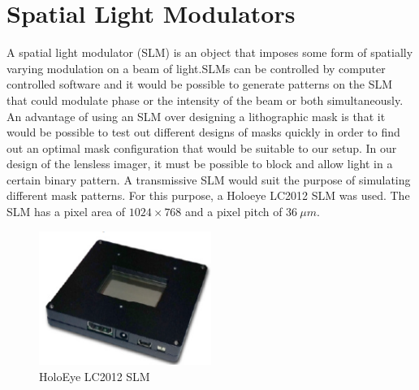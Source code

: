 \section{Spatial Light Modulators}
A spatial light modulator (SLM) is an object that imposes some form of spatially varying modulation on a beam of light\cite{SLMWiki}.SLMs can be controlled by computer controlled software and it would be possible to generate patterns on the SLM that could modulate phase or the intensity of the beam or both simultaneously. An advantage of using an SLM over designing a lithographic mask is that it would be possible to test out different designs of masks quickly in order to find out an optimal mask configuration that would be suitable to our setup. In our design of the lensless imager, it must be possible to block and allow light in a certain binary pattern. A transmissive SLM would suit the purpose of simulating different mask patterns. For this purpose, a Holoeye LC2012 SLM was used. The SLM has a pixel area of $1024 \times 768$ and a pixel pitch of $36\  \mu m$.

\begin{figure}[ht]
\centering
\includegraphics[width=0.50\textwidth]{pics/slm}
\caption{HoloEye LC2012 SLM}
\label{fig:slm}
\end{figure}
